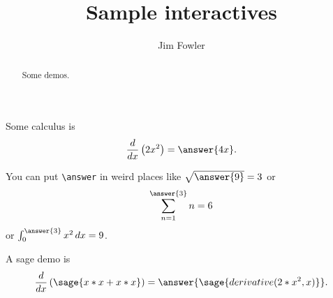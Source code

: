 \documentclass{ximera}
\title{Sample interactives}
\author{Jim Fowler}
\begin{document}
\begin{abstract}
Some demos.
\end{abstract}
\maketitle

\begin{problem}
  Some calculus is
  \[
    \frac{d}{dx} \left( 2x^2 \right) = \answer{4x}.
  \]

  You can put \verb|\answer| in weird places like \(\sqrt{\answer{9}} = 3\) or
  \[
    \sum_{n=1}^{\answer{3}} n = 6
  \]
  or \(\int_{0}^{\answer{3}} x^2 \, dx = 9\).
\end{problem}

\begin{problem}
  A sage demo is
  \[
    \frac{d}{dx} \left( \sage{x*x + x*x} \right) =
      \answer{\sage{derivative(2*x^2,x)}}.
  \]
\end{problem}
\end{document}
